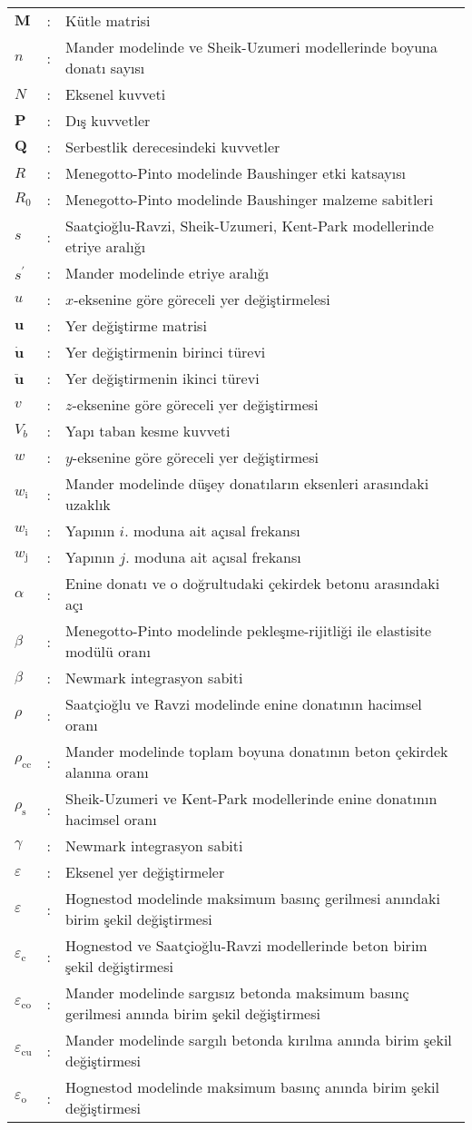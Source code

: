 \begin{longtable}{>{\raggedright}p{1cm}l>{\raggedright}p{13.4cm}}
$\mathbf{M}$ & : & Kütle matrisi\tabularnewline
$n$ & : & Mander modelinde ve Sheik-Uzumeri modellerinde boyuna donatı sayısı\tabularnewline
$N$ & : & Eksenel kuvveti\tabularnewline
$\mathbf{P}$ & : & Dış kuvvetler\tabularnewline
$\mathbf{Q}$ & : & Serbestlik derecesindeki kuvvetler\tabularnewline
$R$ & : & Menegotto-Pinto modelinde Baushinger etki katsayısı\tabularnewline
$R_{0}$ & : & Menegotto-Pinto modelinde Baushinger malzeme sabitleri\tabularnewline
$s$ & : & Saatçioğlu-Ravzi, Sheik-Uzumeri, Kent-Park modellerinde etriye aralığı\tabularnewline
$s^{'}$ & : & Mander modelinde etriye aralığı\tabularnewline
$u$ & : & $x$-eksenine göre göreceli yer değiştirmelesi\tabularnewline
$\mathbf{u}$ & : & Yer değiştirme matrisi\tabularnewline
$\dot{\mathbf{u}}$ & : & Yer değiştirmenin birinci türevi\tabularnewline
$\ddot{\mathbf{u}}$ & : & Yer değiştirmenin ikinci türevi\tabularnewline
$v$ & : & $z$-eksenine göre göreceli yer değiştirmesi\tabularnewline
$V_{b}$ & : & Yapı taban kesme kuvveti \tabularnewline
$w$ & : & $y$-eksenine göre göreceli yer değiştirmesi\tabularnewline
$w_{\text{i}}$ & : & Mander modelinde düşey donatıların eksenleri arasındaki uzaklık\tabularnewline
$w_{\text{i}}$ & : & Yapının $i$. moduna ait açısal frekansı\tabularnewline
$w_{\text{j}}$ & : & Yapının $j$. moduna ait açısal frekansı\tabularnewline
$\alpha$ & : & Enine donatı ve o doğrultudaki çekirdek betonu arasındaki açı \tabularnewline
$\beta$ & : & Menegotto-Pinto modelinde pekleşme-rijitliği ile elastisite modülü
oranı\tabularnewline
$\beta$ & : & Newmark integrasyon sabiti \tabularnewline
$\rho$ & : & Saatçioğlu ve Ravzi modelinde enine donatının hacimsel oranı\tabularnewline
$\rho_{\text{cc}}$ & : & Mander modelinde toplam boyuna donatının beton çekirdek alanına oranı\tabularnewline
$\rho_{\text{s}}$ & : & Sheik-Uzumeri ve Kent-Park modellerinde enine donatının hacimsel oranı\tabularnewline
$\gamma$ & : & Newmark integrasyon sabiti \tabularnewline
\noindent \textit{$\varepsilon$} & : & Eksenel yer değiştirmeler\tabularnewline
$\varepsilon$ & : & Hognestod modelinde maksimum basınç gerilmesi anındaki birim şekil
değiştirmesi\tabularnewline
$\varepsilon_{\mathrm{c}}$ & : & Hognestod ve Saatçioğlu-Ravzi modellerinde beton birim şekil değiştirmesi\tabularnewline
$\varepsilon_{\text{co}}$ & : & Mander modelinde sargısız betonda maksimum basınç gerilmesi anında
birim şekil değiştirmesi\tabularnewline
$\varepsilon_{\text{cu}}$ & : & Mander modelinde sargılı betonda kırılma anında birim şekil değiştirmesi\tabularnewline
$\varepsilon_{\text{o}}$ & : & Hognestod modelinde maksimum basınç anında birim şekil değiştirmesi\tabularnewline

\end{longtable}
